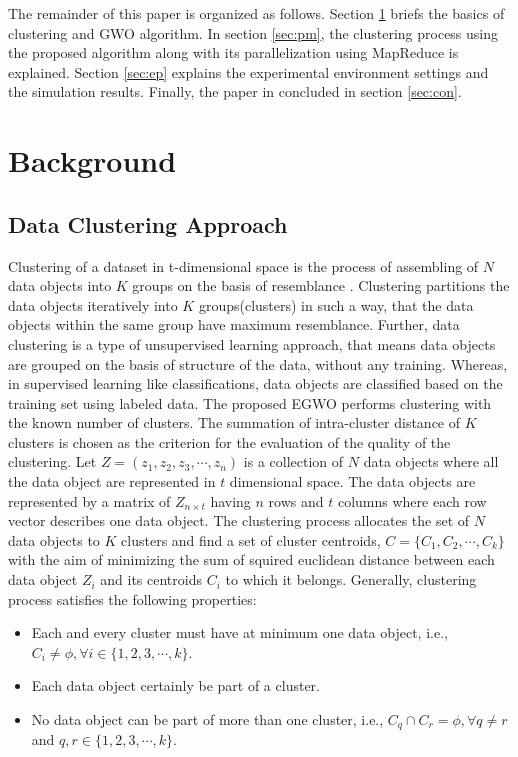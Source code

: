 \documentclass[review]{elsarticle}
\begin{document}
The remainder of this paper is organized as follows. Section \ref{sec:bg} briefs the basics of clustering and GWO algorithm. In section \ref{sec:pm}, the clustering process using the proposed algorithm along with its parallelization using MapReduce is explained. Section \ref{sec:ep} explains the experimental environment settings and the simulation results. Finally, the paper in concluded in section \ref{sec:con}.
\section{Background}\label{sec:bg}

     \subsection{Data Clustering Approach}
  Clustering of a dataset in t-dimensional space is the process of assembling of $N$ data objects into $K$ groups on the basis of resemblance \cite{banharnsakun2016mapreduce}. Clustering partitions the data objects iteratively into $K$ groups(clusters) in such a way, that the data objects within the same group have maximum resemblance. Further, data clustering is a type of unsupervised learning approach, that means data objects are grouped on the basis of structure of the data, without any training. Whereas, in supervised learning like classifications, data objects are classified based on the training set using labeled data.
    The proposed EGWO performs clustering with the known number of clusters. The summation of intra-cluster distance of $K$ clusters is chosen as the criterion for the evaluation of the quality of the clustering. 
Let $Z={(z_1, z_2, z_3, \cdots, z_n)}$ is a collection of $N$ data objects where all the data object are represented in $t$ dimensional space. The data objects are represented by a matrix of $Z_{n\times t}$ having $n$ rows and $t$ columns where each row vector describes one data object. The clustering process allocates the set of $N$ data objects to $K$ clusters and find a set of cluster centroids, $C={\{C_1,C_2, \cdots ,C_k\}}$ with the aim of minimizing the sum of squired euclidean distance between each data object $Z_i$ and its centroids $C_i$ to which it belongs. Generally, clustering process satisfies the following properties: 
\begin{itemize}
\item Each and every cluster must have at minimum one data object, i.e., $C_i \neq \phi , \forall i\in \{1,2,3, \cdots,k\}$.
\item Each data object certainly be part of a cluster.
\item No data object can be part of more than one cluster, i.e., $C_q \cap C_r=\phi,\forall q\neq r$ and $q,r \in \{1,2,3,\cdots,k\}$.
\end{itemize}   
\end{document}

